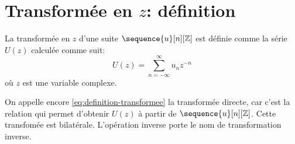 \section{Transformée en $z$: définition}
\begin{definition}[Transformée en $z$]
\label{def:transformee}
La transform\'{e}e en $z$ d'une suite $\sequence{u}[n][\zset]$ est d\'{e}finie comme la s\'{e}rie $U(z)$ calcul\'{e}e comme suit:
\begin{equation}
\label{eq:definition-transformee}
U(z)=\sum_{n=-\infty}^{\infty} u_n z^{-n}
\end{equation}
o\`{u} $z$ est une variable complexe.
\end{definition}
On appelle encore \eqref{eq:definition-transformee} la transform\'{e}e directe, car c'est la relation qui permet d'obtenir $U(z)$ \`{a} partir de $\sequence{u}[n][\zset]$. Cette transfomée est bilatérale. L'op\'{e}ration inverse porte le nom de transformation inverse.

